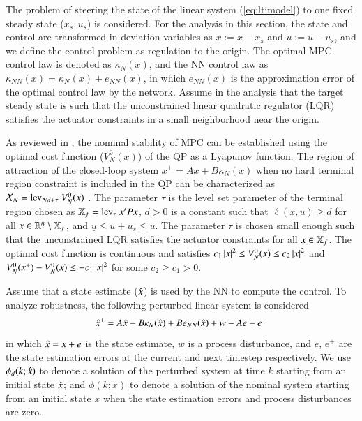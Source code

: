 \documentclass[preprint,5p, twocolumn, authoryear]{elsarticle}
\begin{document}
The problem of steering the state of the linear system (\ref{eq:ltimodel}) to
one fixed steady state ($x_s, u_s$) is considered. For the analysis in this
section, the state and control are transformed in deviation variables as $x := x
- x_s$ and $u := u -u_s$, and we define the control problem as regulation to the
origin. The optimal MPC control law is denoted as $\kappa_N(x)$, and the NN
control law as $\kappa_{NN}(x) = \kappa_N(x) + e_{NN}(x)$, in which $e_{NN}(x)$
is the approximation error of the optimal control law by the network. Assume in
the analysis that the target steady state is such that the unconstrained linear
quadratic regulator (LQR) satisfies the actuator constraints in a small
neighborhood near the origin. 

As reviewed in \cite*{mayne:rawlings:rao:scokaert:2000}, the nominal stability
of MPC can be established using the optimal cost function ($V_N^0(x)$) of the QP
as a Lyapunov function. The region of attraction of the closed-loop system $x^+
= Ax + B\kappa_N(x)$ when no hard terminal region constraint is included in the
QP can be characterized as $\mathcal{X}_N = \textnormal{lev}_{Nd + \tau} \
V_N^0(x)$ \citep*{limon:alamo:salas:camacho:2006}. The parameter $\tau$ is the
level set parameter of the terminal region chosen as $\mathbb{X}_f =
\textnormal{lev}_{\tau} \ x'Px$, $d > 0$ is a constant such that $\ell(x, u)
\geq d$ for all $x \in \mathbb{R}^n \setminus \mathbb{X}_f$, and $\underline{u} \leq u+u_s
\leq \overline{u}$. The parameter $\tau$ is chosen small enough such that the
unconstrained LQR satisfies the actuator constraints for all $x \in \mathbb{X}_f$. The
optimal cost function is continuous and satisfies $c_1\left| x \right|^2 \leq V_N^0(x)
\leq c_2\left| x \right|^2$ and $V_N^0(x^+) - V_N^0(x) \leq -c_1\left| x \right|^2$ for some
$c_2 \geq c_1 > 0$.

Assume that a state estimate ($\hat{x}$) is used by the NN to compute the control.
To analyze robustness, the following perturbed linear system is considered
\begin{align} \label{eq:perturbed_sys}
    \hat{x}^+ = A\hat{x} + B\kappa_N(\hat{x}) + Be_{NN}(\hat{x}) + w - Ae + e^+
\end{align}
in which $\hat{x} = x + e$ is the state estimate, $w$ is a process disturbance,
and $e$, $e^+$ are the state estimation errors at the current and next timestep
respectively. We use $\phi_d(k;\hat{x})$ to denote a solution of the perturbed
system  at time $k$ starting from an initial state $\hat{x}$; and $\phi(k;x)$ to
denote a solution  of the nominal system starting  from an initial state $x$
when the state estimation errors and process disturbances are zero.
\end{document}
